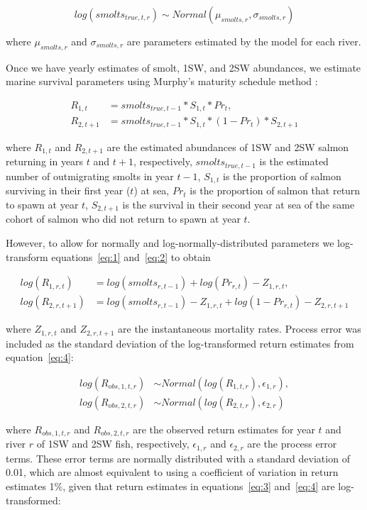 \documentclass[12pt]{article}
\begin{document}
\begin{equation}
log(smolts_{true,t,r}) \sim Normal(\mu_{smolts,r}, \sigma_{smolts,r})
\end{equation}

where $\mu_{smolts,r}$ and $\sigma_{smolts,r}$ are parameters estimated by the
model for each river.

Once we have yearly estimates of smolt, 1SW, and 2SW abundances, we estimate
marine survival parameters using Murphy's maturity schedule method
\citep{Murphy1952, Ricker1975}:

\begin{align}
    R_{1,t} &= smolts_{true,t-1} * S_{1,t} * Pr_t \label{eq:1}, \\
    R_{2,t+1} &= smolts_{true,t-1} * S_{1,t} * (1 - Pr_t) * S_{2,t+1} \label{eq:2}
\end{align}

where $R_{1,t}$ and $R_{2,t+1}$ are the estimated abundances of 1SW and 2SW
salmon returning in years $t$ and $t+1$, respectively, $smolts_{true,t-1}$ is the
estimated number of outmigrating smolts in year $t-1$, $S_{1,t}$ is the proportion of
salmon surviving in their first year ($t$) at sea, $Pr_t$ is the proportion of
salmon that return to spawn at year $t$, $S_{2,t+1}$ is the survival in their
second year at sea of the same cohort of salmon who did not return to spawn at
year $t$.

However, to allow for normally and log-normally-distributed parameters we
log-transform equations~\ref{eq:1} and~\ref{eq:2} to obtain

\begin{align}
    log(R_{1,r,t}) &= log(smolts_{r,t-1}) + log(Pr_{r,t}) - Z_{1,r,t} \label{eq:3}, \\
    log(R_{2,r,t+1}) &= log(smolts_{r,t-1}) - Z_{1,r,t} + log(1 - Pr_{r,t})  - Z_{2,r,t+1} \label{eq:4} 
\end{align}

where $Z_{1,r,t}$ and $Z_{2,r,t+1}$ are the instantaneous mortality rates.
Process error was included as the standard deviation of the log-transformed
return estimates from equation~\ref{eq:4}:

\begin{align}
log(R_{obs,1,t,r}) &\sim Normal(log(R_{1,t,r}), \epsilon_{1,r}), \\
log(R_{obs,2,t,r}) &\sim Normal(log(R_{2,t,r}), \epsilon_{2,r}) \label{eq:5} 
\end{align}

where $R_{obs,1,t,r}$ and $R_{obs,2,t,r}$ are the observed return estimates
for year $t$ and river $r$ of 1SW and 2SW fish, respectively, $\epsilon_{1,r}$
and $\epsilon_{2,r}$ are the process error terms. 
These error terms are normally distributed with a standard deviation
of 0.01, which are almost equivalent to using a coefficient of variation in
return estimates 1\%, given that return estimates in equations~\ref{eq:3}
and~\ref{eq:4} are log-transformed:
\end{document}
